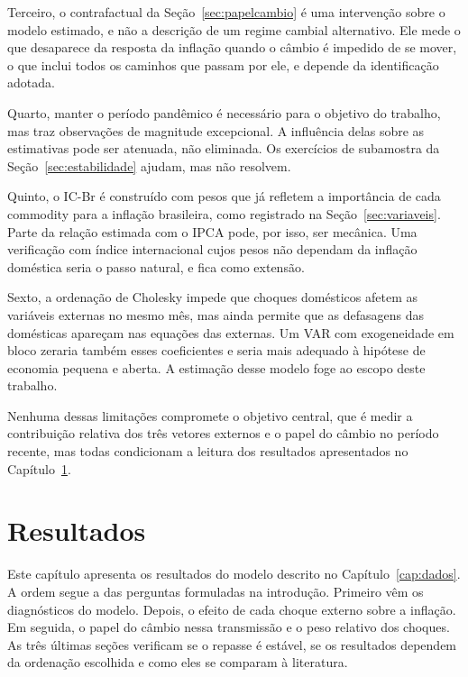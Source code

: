 \documentclass[12pt,openright,oneside,a4paper,portuguese,brazil]{abntex2}
\begin{document}
Terceiro, o contrafactual da Seção~\ref{sec:papelcambio} é uma
intervenção sobre o modelo estimado, e não a descrição de um regime cambial
alternativo. Ele mede o que desaparece da resposta da inflação quando o câmbio
é impedido de se mover, o que inclui todos os caminhos que passam por ele, e
depende da identificação adotada.

Quarto, manter o período pandêmico é necessário para o objetivo do trabalho,
mas traz observações de magnitude excepcional. A influência delas sobre as
estimativas pode ser atenuada, não eliminada. Os exercícios de subamostra da
Seção~\ref{sec:estabilidade} ajudam, mas não resolvem.

Quinto, o IC-Br é construído com pesos que já refletem a importância de cada
commodity para a inflação brasileira, como registrado na
Seção~\ref{sec:variaveis}. Parte da relação estimada com o IPCA pode, por
isso, ser mecânica. Uma verificação com índice internacional cujos pesos não
dependam da inflação doméstica seria o passo natural, e fica como extensão.

Sexto, a ordenação de Cholesky impede que choques domésticos afetem as
variáveis externas no mesmo mês, mas ainda permite que as defasagens das
domésticas apareçam nas equações das externas. Um VAR com exogeneidade em
bloco zeraria também esses coeficientes e seria mais adequado à hipótese de
economia pequena e aberta. A estimação desse modelo foge ao escopo deste
trabalho.

Nenhuma dessas limitações compromete o objetivo central, que é medir a
contribuição relativa dos três vetores externos e o papel do câmbio no período
recente, mas todas condicionam a leitura dos resultados apresentados no
Capítulo~\ref{cap:resultados}.



\chapter{Resultados}
\label{cap:resultados}

Este capítulo apresenta os resultados do modelo descrito no
Capítulo~\ref{cap:dados}. A ordem segue a das perguntas formuladas na introdução. Primeiro vêm os
diagnósticos do modelo. Depois, o efeito de cada choque externo sobre a
inflação. Em seguida, o papel do câmbio nessa transmissão e o peso relativo
dos choques. As três últimas seções verificam se o repasse é estável, se os
resultados dependem da ordenação escolhida e como eles se comparam à
literatura.
\end{document}
